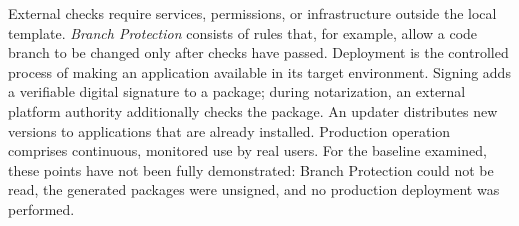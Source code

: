 \begin{beginnerstatement}

External checks require services, permissions, or infrastructure outside the
local template. \emph{Branch Protection} consists of rules that, for example,
allow a code branch to be changed only after checks have passed. Deployment is
the controlled process of making an application available in its target
environment. Signing adds a verifiable digital signature to a package; during
notarization, an external platform authority additionally checks the package.
An updater distributes new versions to applications that are already
installed. Production operation comprises continuous, monitored use by real
users. For the baseline examined, these points have not been fully
demonstrated: Branch Protection could not be read, the generated packages were
unsigned, and no production deployment was performed.

\end{beginnerstatement}
